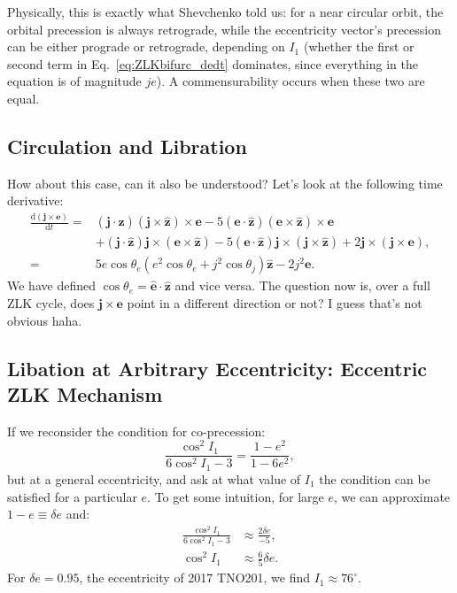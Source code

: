 \documentclass[12pt]{article}
\newcommand*{\rd}[2]{\frac{\mathrm{d}#1}{\mathrm{d}#2}}
\newcommand*{\bm}[1]{\boldsymbol{\mathbf{#1}}}
\newcommand*{\uv}[1]{\hat{\bm{#1}}}
\newcommand*{\p}[1]{\left(#1\right)}
\begin{document}
Physically, this is exactly what Shevchenko told us: for a near circular orbit,
the orbital precession is always retrograde, while the eccentricity vector's
precession can be either prograde or retrograde, depending on $I_1$ (whether the
first or second term in Eq.~\ref{eq:ZLKbifurc_dedt} dominates, since everything
in the equation is of magnitude $je$).
A commensurability occurs when these two are equal.

\subsection{Circulation and Libration}

How about this case, can it also be understood?
Let's look at the following time derivative:
\begin{align}
    \rd{(\bm{j} \times \bm{e})}{t}
        ={}&
            \p{\bm{j} \cdot \uv{z}} \p{\bm{j} \times \uv{z}}
                \times \bm{e}
            - 5 \p{\bm{e} \cdot \uv{z}} \p{\bm{e} \times \uv{z}}
                \times \bm{e}\nonumber\\
        &+ \p{\bm{j} \cdot \uv{z}} \bm{j} \times \p{\bm{e} \times \uv{z}}
            - 5 \p{\bm{e} \cdot \uv{z}} \bm{j} \times \p{\bm{j} \times \uv{z}}
            + 2\bm{j} \times (\bm{j} \times \bm{e}),\\
        ={}&
            5 e\cos \theta_e (e^2\cos \theta_e + j^2\cos \theta_j)\uv{z}
            - 2j^2\bm{e}.
\end{align}
We have defined $\cos \theta_e = \uv{e} \cdot \uv{z}$ and vice versa.
The question now is, over a full ZLK cycle, does $\bm{j} \times \bm{e}$ point in
a different direction or not?
I guess that's not obvious haha.

\subsection{Libation at Arbitrary Eccentricity: Eccentric ZLK Mechanism}

If we reconsider the condition for co-precession:
\begin{equation}
    \frac{\cos^2 I_1}{
            6\cos^2 I_1 - 3}
        =
            \frac{1 - e^2}{1 - 6e^2},
\end{equation}
but at a general eccentricity, and ask at what value of $I_1$ the condition can
be satisfied for a particular $e$.
To get some intuition, for large $e$, we can approximate $1 - e \equiv \delta e$
and:
\begin{align}
    \frac{\cos^2 I_1}{
            6\cos^2 I_1 - 3}
        &\approx
            \frac{2\delta e}{-5},\\
    \cos^2 I_1
        &\approx
            \frac{6}{5}\delta e.
\end{align}
For $\delta e = 0.95$, the eccentricity of 2017 TNO201, we find $I_1 \approx
76^\circ$.
\end{document}
